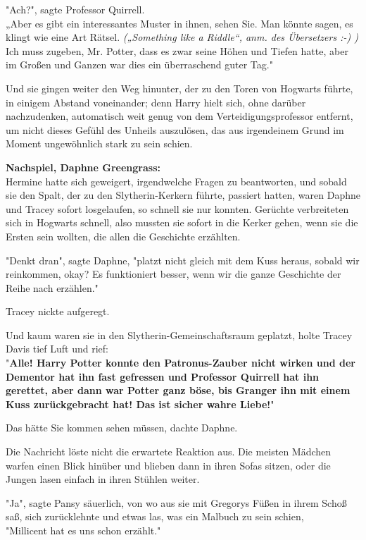 {"Ach?", sagte Professor Quirrell.\\ „Aber es gibt ein interessantes Muster in ihnen, sehen Sie. Man könnte sagen, es klingt wie eine Art Rätsel. \emph{(„Something like a Riddle“, anm. des Übersetzers :-) )}\\ Ich muss zugeben, Mr. Potter, dass es zwar seine Höhen und Tiefen hatte, aber im Großen und Ganzen war dies ein überraschend guter Tag."

Und sie gingen weiter den Weg hinunter, der zu den Toren von Hogwarts führte, in einigem Abstand voneinander; denn Harry hielt sich, ohne darüber nachzudenken, automatisch weit genug von dem Verteidigungsprofessor entfernt, um nicht dieses Gefühl des Unheils auszulösen, das aus irgendeinem Grund im Moment ungewöhnlich stark zu sein schien.

\textbf{Nachspiel, Daphne Greengrass:}\\ Hermine hatte sich geweigert, irgendwelche Fragen zu beantworten, und sobald sie den Spalt, der zu den Slytherin-Kerkern führte, passiert hatten, waren Daphne und Tracey sofort losgelaufen, so schnell sie nur konnten. Gerüchte verbreiteten sich in Hogwarts schnell, also mussten sie sofort in die Kerker gehen, wenn sie die Ersten sein wollten, die allen die Geschichte erzählten.

"Denkt dran", sagte Daphne, "platzt nicht gleich mit dem Kuss heraus, sobald wir reinkommen, okay? Es funktioniert besser, wenn wir die ganze Geschichte der Reihe nach erzählen."

Tracey nickte aufgeregt.

Und kaum waren sie in den Slytherin-Gemeinschaftsraum geplatzt, holte Tracey Davis tief Luft und rief:\\ "\textbf{Alle! Harry Potter konnte den Patronus-Zauber nicht wirken und der Dementor hat ihn fast gefressen und Professor Quirrell hat ihn gerettet, aber dann war Potter ganz böse, bis Granger ihn mit einem Kuss zurückgebracht hat! Das ist sicher wahre Liebe!}"

Das hätte Sie kommen sehen müssen, dachte Daphne.

Die Nachricht löste nicht die erwartete Reaktion aus. Die meisten Mädchen warfen einen Blick hinüber und blieben dann in ihren Sofas sitzen, oder die Jungen lasen einfach in ihren Stühlen weiter.

"Ja", sagte Pansy säuerlich, von wo aus sie mit Gregorys Füßen in ihrem Schoß saß, sich zurücklehnte und etwas las, was ein Malbuch zu sein schien,\\ "Millicent hat es uns schon erzählt."

}
